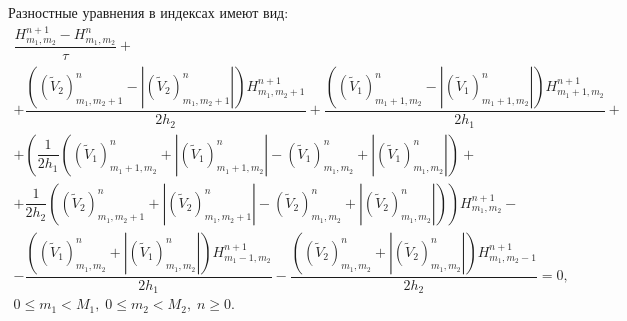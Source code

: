 \documentclass[a4paper,11pt]{article}
\begin{document}
Разностные уравнения в индексах имеют вид:
\begin{equation}
\begin{array}{c}
\dfrac{H^{n+1}_{m_1,m_2}-H^n_{m_1,m_2}}{\tau}+\\
+\dfrac{
(({{\tilde V}_2})^n_{m_1,m_2+1}-|({{\tilde V}_2})^n_{m_1,m_2+1}|)H_{m_1,m_2+1}^{n+1}
}{2h_2}
+\dfrac{
(({{\tilde V}_1})^n_{m_1+1,m_2}-|({{\tilde V}_1})^n_{m_1+1,m_2}|)H_{m_1+1,m_2}^{n+1}
}{2h_1}+ \\
+\left(\dfrac{1}{2h_1}
(({{\tilde V}_1})^n_{m_1+1,m_2}+|({{\tilde V}_1})^n_{m_1+1,m_2}|
-({{\tilde V}_1})^n_{m_1,m_2}+|({{\tilde V}_1})^n_{m_1,m_2}|)+\right.\\
\left.+\dfrac{1}{2h_2}
(({{\tilde V}_2})^n_{m_1,m_2+1}+|({{\tilde V}_2})^n_{m_1,m_2+1}|
-({{\tilde V}_2})^n_{m_1,m_2}+|({{\tilde V}_2})^n_{m_1,m_2}|)\right)
H_{m_1,m_2}^{n+1}
- \\
-\dfrac{
(({{\tilde V}_1})^n_{m_1,m_2}+|({{\tilde V}_1})^n_{m_1,m_2}|)H_{m_1-1,m_2}^{n+1}
}{2h_1}
-\dfrac{
(({{\tilde V}_2})^n_{m_1,m_2}+|({{\tilde V}_2})^n_{m_1,m_2}|)H_{m_1,m_2-1}^{n+1}
}{2h_2}=0, \\
0\le m_1 <M_1,\;0\le m_2 <M_2,\; n\ge 0.
\end{array}
\label{r_i_sok.2}
\end{equation}
\end{document}
